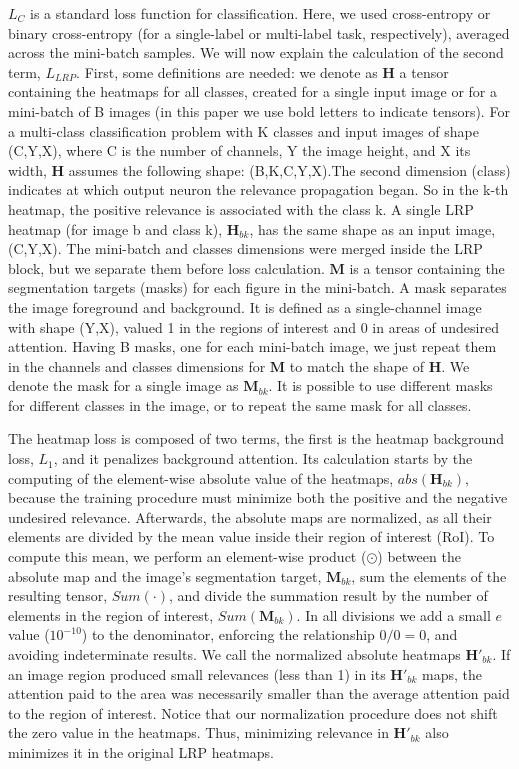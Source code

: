 \documentclass[fleqn,10pt]{wlscirep}
\begin{document}
{$L_{C}$ is a standard loss function for classification. Here, we used cross-entropy or binary cross-entropy (for a single-label or multi-label task, respectively), averaged across the mini-batch samples. We will now explain the calculation of the second term, $L_{LRP}$. First, some definitions are needed: we denote as $\bm{H}$ a tensor containing the heatmaps for all classes, created for a single input image or for a mini-batch of B images (in this paper we use bold letters to indicate tensors). For a multi-class classification problem with K classes and input images of shape (C,Y,X), where C is the number of channels, Y the image height, and X its width, $\bm{H}$ assumes the following shape: (B,K,C,Y,X).The second dimension (class) indicates at which output neuron the relevance propagation began. So in the k-th heatmap, the positive relevance is associated with the class k. A single LRP heatmap (for image b and class k), $\bm{H}_{bk}$, has the same shape as an input image, (C,Y,X). The mini-batch and classes dimensions were merged inside the LRP block, but we separate them before loss calculation. $\bm{M}$ is a tensor containing the segmentation targets (masks) for each figure in the mini-batch. A mask separates the image foreground and background. It is defined as a single-channel image with shape (Y,X), valued 1 in the regions of interest and 0 in areas of undesired attention. Having B masks, one for each mini-batch image, we just repeat them in the channels and classes dimensions for $\bm{M}$ to match the shape of $\bm{H}$. We denote the mask for a single image as $\bm{M}_{bk}$. It is possible to use different masks for different classes in the image, or to repeat the same mask for all classes.

The heatmap loss is composed of two terms, the first is the heatmap background loss, $L_{1}$, and it penalizes background attention. Its calculation starts by the computing of the element-wise absolute value of the heatmaps, $abs(\bm{H}_{bk})$, because the training procedure must minimize both the positive and the negative undesired relevance. Afterwards, the absolute maps are normalized, as all their elements are divided by the mean value inside their region of interest (RoI). To compute this mean, we perform an element-wise product ($\odot$) between the absolute map and the image's segmentation target, $\bm{M}_{bk}$, sum the elements of the resulting tensor, $Sum(\cdot)$, and divide the summation result by the number of elements in the region of interest, $Sum(\bm{M}_{bk})$. In all divisions we add a small $e$ value ($10^{-10}$) to the denominator, enforcing the relationship $0/0=0$, and avoiding indeterminate results. We call the normalized absolute heatmaps $\bm{H'}_{bk}$. If an image region produced small relevances (less than 1) in its $\bm{H'}_{bk}$ maps, the attention paid to the area was necessarily smaller than the average attention paid to the region of interest. Notice that our normalization procedure does not shift the zero value in the heatmaps. Thus, minimizing relevance in $\bm{H'}_{bk}$ also minimizes it in the original LRP heatmaps.

}
\end{document}

